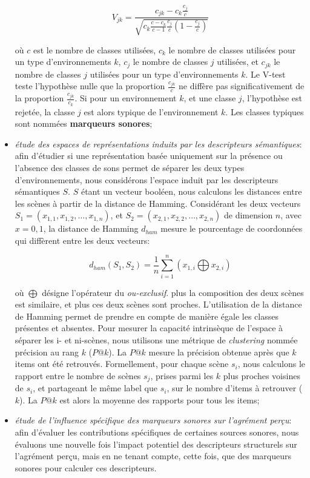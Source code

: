 \begin{itemize}
\begin{equation*}
V_{jk}=\dfrac{c_{jk}-c_k\frac{c_j}{c}}{\sqrt{c_k\frac{c-c_k}{c-1}\frac{c_j}{c}(1-\frac{c_j}{c})}}
\end{equation*}

où $c$ est le nombre de classes utilisées, $c_k$ le nombre de classes utilisées pour un type d'environnements $k$, $c_j$ le nombre de classes $j$ utilisées, et $c_{jk}$ le nombre de classes $j$ utilisées pour un type d'environnements $k$. Le V-test teste l'hypothèse nulle que la proportion $\frac{c_{jk}}{c}$ ne diffère pas significativement de la proportion $\frac{c_{jk}}{c_k}$. Si pour un environnement $k$, et une classe $j$, l'hypothèse est rejetée, la classe $j$ est alors typique de l'environnement $k$. Les classes typiques sont nommées \textbf{marqueurs sonores};

\item \emph{étude des espaces de représentations induits par les descripteurs sémantiques}: afin d'étudier si une représentation basée uniquement sur la présence ou l'absence des classes de sons permet de séparer les deux types d'environnements, nous considérons l'espace induit par les descripteurs sémantiques $S$. $S$ étant un vecteur booléen, nous calculons les distances entre les scènes à partir de la distance de Hamming. Considérant les deux vecteurs $S_1=(x_{1,1},x_{1,2},\ldots,x_{1,n})$, et $S_2=(x_{2,1},x_{2,2},\ldots,x_{2,n})$ de dimension $n$, avec $x={0,1}$, la distance de Hamming $d_{ham}$ mesure le pourcentage de coordonnées qui diffèrent entre les deux vecteurs:   


\begin{equation*}
d_{ham}(S_1,S_2)=\dfrac{1}{n}\sum_{i=1}^{n} (x_{1,i} \bigoplus x_{2,i})
\end{equation*}

où $\bigoplus$ désigne l'opérateur du \emph{ou-exclusif}. plus la composition des deux scènes est similaire, et plus ces deux scènes sont proches. L'utilisation de la distance de Hamming permet de prendre en compte de manière égale les classes présentes et absentes. Pour mesurer la capacité intrinsèque de l'espace à séparer les i- et ni-scènes, nous utilisons une métrique de \emph{clustering} nommée précision au rang $k$ ($P@k$). La $P@k$ mesure la précision obtenue après que $k$ items ont été retrouvés. Formellement, pour chaque scène $s_i$, nous calculons le rapport entre le nombre de scènes $s_j$, prises parmi les $k$ plus proches voisines de $s_i$, et  partageant le même label que $s_i$, sur le nombre d'items à retrouver ($k$). La $P@k$ est alors la moyenne des rapports pour tous les items;

\item \emph{étude de l'influence spécifique des marqueurs sonores sur l'agrément perçu}: afin d'évaluer les contributions spécifiques de certaines sources sonores, nous évaluons une nouvelle fois l'impact potentiel des descripteurs structurels sur l'agrément perçu, mais en ne tenant compte, cette fois, que des marqueurs sonores pour calculer ces descripteurs.
\end{itemize}

